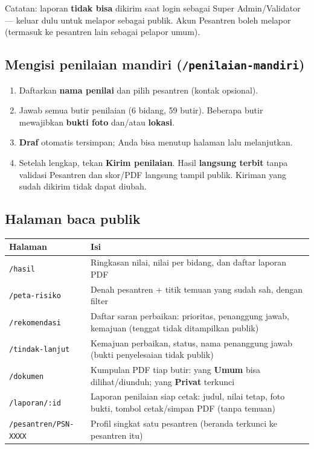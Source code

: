 \documentclass[11pt,a4paper]{article}
\newcommand{\code}[1]{\texttt{#1}}
\begin{document}
\noindent Catatan: laporan \textbf{tidak bisa} dikirim saat login sebagai Super
Admin/Validator --- keluar dulu untuk melapor sebagai publik. Akun Pesantren boleh
melapor (termasuk ke pesantren lain sebagai pelapor umum).

\subsection{Mengisi penilaian mandiri (\code{/penilaian-mandiri})}
\begin{enumerate}
  \item Daftarkan \textbf{nama penilai} dan pilih pesantren (kontak opsional).
  \item Jawab semua butir penilaian (6 bidang, 59 butir). Beberapa butir mewajibkan
        \textbf{bukti foto} dan/atau \textbf{lokasi}.
  \item \textbf{Draf} otomatis tersimpan; Anda bisa menutup halaman lalu melanjutkan.
  \item Setelah lengkap, tekan \textbf{Kirim penilaian}. Hasil \textbf{langsung
        terbit} tanpa validasi Pesantren dan skor/PDF langsung tampil publik.
        Kiriman yang sudah dikirim tidak dapat diubah.
\end{enumerate}

\subsection{Halaman baca publik}

\begin{longtable}{@{}>{\raggedright\arraybackslash}p{3.6cm}>{\raggedright\arraybackslash}p{11.2cm}@{}}
\toprule
\textbf{Halaman} & \textbf{Isi} \\
\midrule
\endhead
\code{/hasil} & Ringkasan nilai, nilai per bidang, dan daftar laporan PDF \\
\code{/peta-risiko} & Denah pesantren + titik temuan yang sudah sah, dengan filter \\
\code{/rekomendasi} & Daftar saran perbaikan: prioritas, penanggung jawab, kemajuan
                    (tenggat tidak ditampilkan publik) \\
\code{/tindak-lanjut} & Kemajuan perbaikan, status, nama penanggung jawab
                       (bukti penyelesaian tidak publik) \\
\code{/dokumen} & Kumpulan PDF tiap butir: yang \textbf{Umum} bisa dilihat/diunduh;
                 yang \textbf{Privat} terkunci \\
\code{/laporan/:id} & Laporan penilaian siap cetak: judul, nilai tetap, foto bukti,
                     tombol cetak/simpan PDF (tanpa temuan) \\
\code{/pesantren/\allowbreak PSN-XXXX} & Profil singkat satu pesantren (beranda terkunci ke
                            pesantren itu) \\
\bottomrule
\end{longtable}
\end{document}

